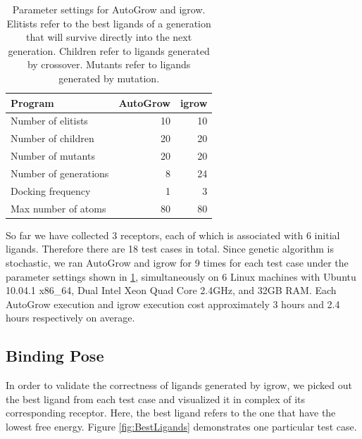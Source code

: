\documentclass[10pt, conference, compsocconf]{IEEEtran}
\begin{document}
\begin{table}
\centering
\begin{tabular*}
{\linewidth}
{@{\extracolsep{\fill}}lrr}
\noalign{\smallskip}\toprule
Program & AutoGrow & igrow\\
\midrule
\noalign{\smallskip}
Number of elitists & 10 & 10\\
Number of children & 20 & 20\\
Number of mutants & 20 & 20\\
Number of generations & 8 & 24\\
Docking frequency & 1 & 3\\
Max number of atoms & 80 & 80\\
\bottomrule
\end{tabular*}
\caption{Parameter settings for AutoGrow and igrow. Elitists refer to the best ligands of a generation that will survive directly into the next generation. Children refer to ligands generated by crossover. Mutants refer to ligands generated by mutation.}
\label{tab:ParameterSettings}
\end{table}

So far we have collected 3 receptors, each of which is associated with 6 initial ligands. Therefore there are 18 test cases in total. Since genetic algorithm is stochastic, we ran AutoGrow and igrow for 9 times for each test case under the parameter settings shown in \ref{tab:ParameterSettings}, simultaneously on 6 Linux machines with Ubuntu 10.04.1 x86\_64, Dual Intel Xeon Quad Core 2.4GHz, and 32GB RAM. Each AutoGrow execution and igrow execution cost approximately 3 hours and 2.4 hours respectively on average.

\subsection{Binding Pose}

In order to validate the correctness of ligands generated by igrow, we picked out the best ligand from each test case and visualized it in complex of its corresponding receptor. Here, the best ligand refers to the one that have the lowest free energy.
Figure \ref{fig:BestLigands} demonstrates one particular test case.
\end{document}
